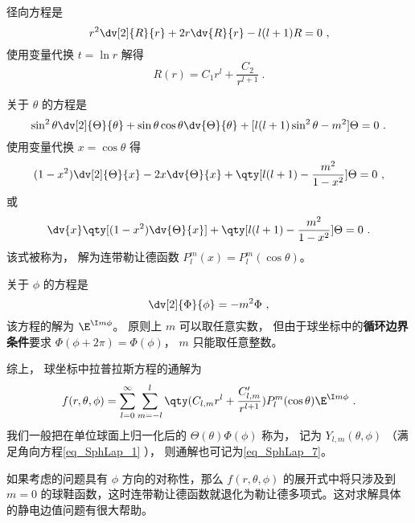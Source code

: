 径向方程是
\begin{equation}
r^2\dv[2]{R}{r} + 2r\dv{R}{r} - l(l+1)R = 0~,
\end{equation}
使用变量代换 $t = \ln r$ 解得
\begin{equation}
R(r) = C_1 r^l + \frac{C_2}{r^{l+1}}~.
\end{equation}

关于 $\theta$ 的方程是
\begin{equation}
\sin^2\theta \dv[2]{\Theta}{\theta} + \sin\theta\cos\theta\dv{\Theta}{\theta} + [l(l+1)\sin^2\theta - m^2] \Theta = 0~.
\end{equation}
使用变量代换 $x = \cos\theta$ 得
\begin{equation}
(1-x^2)\dv[2]{\Theta}{x} - 2x\dv{\Theta}{x} + \qty[l(l+1) - \frac{m^2}{1-x^2}]\Theta = 0~,
\end{equation}
或
\begin{equation}
\dv{x} \qty[(1-x^2)\dv{\Theta}{x}] + \qty[l(l+1) - \frac{m^2}{1-x^2}]\Theta = 0~.
\end{equation}
该式被称为， 解为连带勒让德函数 $P_l^m(x) = P_l^m(\cos\theta)$。

关于 $\phi$ 的方程是
\begin{equation}
\dv[2]{\Phi}{\phi} = -m^2 \Phi~,
\end{equation}
该方程的解为 $\E^{\I m\phi}$。 原则上 $m$ 可以取任意实数， 但由于球坐标中的\textbf{循环边界条件}要求 $\Phi(\phi + 2\pi) = \Phi(\phi)$， $m$ 只能取任意整数。

综上， 球坐标中拉普拉斯方程的通解为
\begin{equation}\label{eq_SphLap_6}
f(r, \theta, \phi) = \sum_{l = 0}^\infty \sum_{m = -l}^l \qty(C_{l,m} r^l + \frac{C'_{l,m}}{r^{l+1}})P_l^m(\cos\theta)\E^{\I m\phi}~.
\end{equation}
我们一般把在单位球面上归一化后的 $\Theta(\theta)\Phi(\phi)$ 称为， 记为 $Y_{l,m}(\theta,\phi)$ （满足角向方程\autoref{eq_SphLap_1} ）， 则通解也可记为\autoref{eq_SphLap_7}。

如果考虑的问题具有 $\phi$ 方向的对称性，那么 $f(r,\theta,\phi)$ 的展开式中将只涉及到 $m=0$ 的球鞋函数，这时连带勒让德函数就退化为勒让德多项式。这对求解具体的静电边值问题有很大帮助。

